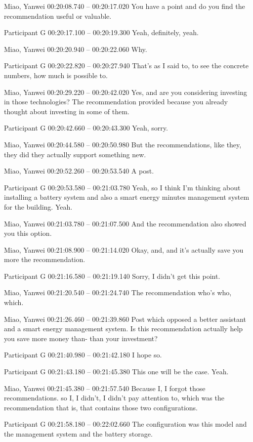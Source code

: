 {Miao, Yanwei 00:20:08.740 -- 00:20:17.020
You have a point and do you find the recommendation useful or valuable.

Participant G 00:20:17.100 -- 00:20:19.300
Yeah, definitely, yeah.

Miao, Yanwei 00:20:20.940 -- 00:20:22.060
Why.

Participant G 00:20:22.820 -- 00:20:27.940
That's as I said to, to see the concrete numbers, how much is possible to.

Miao, Yanwei 00:20:29.220 -- 00:20:42.020
Yes, and are you considering investing in those technologies? The recommendation provided because you already thought about investing in some of them.

Participant G 00:20:42.660 -- 00:20:43.300
Yeah, sorry.

Miao, Yanwei 00:20:44.580 -- 00:20:50.980
But the recommendations, like they, they did they actually support something new.

Miao, Yanwei 00:20:52.260 -- 00:20:53.540
A post.

Participant G 00:20:53.580 -- 00:21:03.780
Yeah, so I think I'm thinking about installing a battery system and also a smart energy minutes management system for the building. Yeah.

Miao, Yanwei 00:21:03.780 -- 00:21:07.500
And the recommendation also showed you this option.

Miao, Yanwei 00:21:08.900 -- 00:21:14.020
Okay, and, and it's actually save you more the recommendation.

Participant G 00:21:16.580 -- 00:21:19.140
Sorry, I didn't get this point.

Miao, Yanwei 00:21:20.540 -- 00:21:24.740
The recommendation who's who, which.

Miao, Yanwei 00:21:26.460 -- 00:21:39.860
Post which opposed a better assistant and a smart energy management system. Is this recommendation actually help you save more money than- than your investment?

Participant G 00:21:40.980 -- 00:21:42.180
I hope so.

Participant G 00:21:43.180 -- 00:21:45.380
This one will be the case. Yeah.

Miao, Yanwei 00:21:45.380 -- 00:21:57.540
Because I, I forgot those recommendations. so I, I didn't, I didn't pay attention to, which was the recommendation that is, that contains those two configurations.

Participant G 00:21:58.180 -- 00:22:02.660
The configuration was this model and the management system and the battery storage.

}
